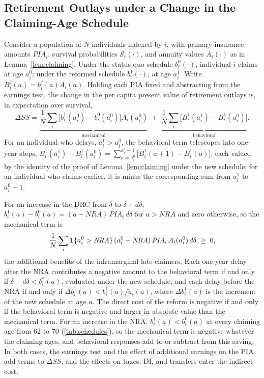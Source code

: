 \subsection{Retirement Outlays under a Change in the Claiming-Age Schedule}

Consider a population of $N$ individuals indexed by $i$, with primary insurance amounts $\mathit{PIA}_i$, survival probabilities $\mathcal{S}_i(\cdot)$, and annuity values $A_i(\cdot)$ as in Lemma~\ref{lem:claiming}. Under the status-quo schedule $b^0_i(\cdot)$, individual $i$ claims at age $a^0_i$; under the reformed schedule $b^1_i(\cdot)$, at age $a^1_i$. Write $B^{j}_i(a)=b^{j}_i(a)A_i(a)$. Holding each PIA fixed and abstracting from the earnings test, the change in the per capita present value of retirement outlays is, in expectation over survival,
\begin{equation*}
\Delta\mathit{SS}
=\underbrace{\frac{1}{N}\sum_{i}\big[b^{1}_i(a^{0}_i)-b^{0}_i(a^{0}_i)\big]A_i(a^{0}_i)}_{\text{mechanical}}
\;+\;\underbrace{\frac{1}{N}\sum_{i}\big[B^{1}_i(a^{1}_i)-B^{1}_i(a^{0}_i)\big]}_{\text{behavioral}}.
\end{equation*}
For an individual who delays, $a^1_i>a^0_i$, the behavioral term telescopes into one-year steps, $B^{1}_i(a^{1}_i)-B^{1}_i(a^{0}_i)=\sum_{a=a^0_i}^{a^1_i-1}\big[B^{1}_i(a+1)-B^{1}_i(a)\big]$, each valued by the identity of the proof of Lemma~\ref{lem:claiming} under the new schedule; for an individual who claims earlier, it is minus the corresponding sum from $a^1_i$ to $a^0_i-1$.

For an increase in the DRC from $\delta$ to $\delta+d\delta$, $b^{1}_i(a)-b^{0}_i(a)=(a-\mathit{NRA})\,\mathit{PIA}_i\,d\delta$ for $a>\mathit{NRA}$ and zero otherwise, so the mechanical term is
\begin{equation*}
\frac{1}{N}\sum_{i}\mathbf{1}\{a^{0}_i>\mathit{NRA}\}\,(a^{0}_i-\mathit{NRA})\,\mathit{PIA}_i\,A_i(a^{0}_i)\,d\delta\;\geq\;0,
\end{equation*}
the additional benefits of the inframarginal late claimers. Each one-year delay after the NRA contributes a negative amount to the behavioral term if and only if $\delta+d\delta<\delta^{*}_i(a)$, evaluated under the new schedule, and each delay before the NRA if and only if $\Delta b^{1}_i(a)<b^{1}_i(a)/\ddot a_i(a)$, where $\Delta b^{1}_i(a)$ is the increment of the new schedule at age $a$. The direct cost of the reform is negative if and only if the behavioral term is negative and larger in absolute value than the mechanical term. For an increase in the NRA, $b^{1}_i(a)<b^{0}_i(a)$ at every claiming age from 62 to 70 (\autoref{tab:schedules}), so the mechanical term is negative whatever the claiming ages, and behavioral responses add to or subtract from this saving. In both cases, the earnings test and the effect of additional earnings on the PIA add terms to $\Delta\mathit{SS}$, and the effects on taxes, DI, and transfers enter the indirect cost.

